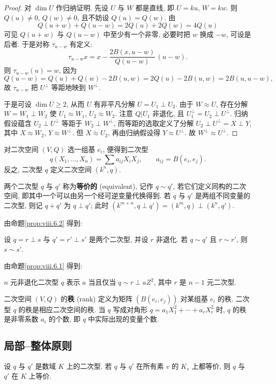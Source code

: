 \begin{proof}
对 $\dim U$ 作归纳证明. 先设 $U$ 与 $W$ 都是直线, 即 $U=ku$, $W=kw$. 则 $Q(u)\ne 0$, $Q(w)\ne 0$, 且不妨设 $Q(u)=Q(w)$. 由
\[
Q(u+w)+Q(u-w)=2Q(u)+2Q(w)=4Q(u)
\]
可见 $Q(u+w)$ 与 $Q(u-w)$ 中至少有一个非零, 必要时把 $w$ 换成 $-w$, 可设是后者. 于是对称 $\tau_{u-w}$ 有定义:
\[
\tau_{u-w}x=x-\frac{2B(x,u-w)}{Q(u-w)}\,(u-w).
\]
则 $\tau_{u-w}(u)=w$, 因为
\[
Q(u-w)=Q(u)+Q(w)-2B(u,w)=2Q(u)-2B(u,w)=2B(u,u-w),
\]
故 $\tau_{u-w}$ 把 $U^{\perp}$ 等距地映到 $W^{\perp}$.

于是可设 $\dim U\ge 2$, 从而 $U$ 有非平凡分解 $U=U_1\perp U_2$. 由于 $W\approx U$, 存在分解 $W=W_1\perp W_2$ 使 $U_1\approx W_1$, $U_2\approx W_2$. 注意 $Q|U_1$ 非退化, 且 $U_1^{\perp}=U_2\perp U^{\perp}$. 归纳假设蕴含 $U_2\perp U^{\perp}$ 等距于 $W_2\perp W^{\perp}$, 而等距的选取定义了分解 $U_2\perp U^{\perp}=X\perp Y$, 其中 $X\approx W_2$, $Y\approx W^{\perp}$. 但 $X\approx U_2$, 再由归纳假设得 $Y\approx U^{\perp}$. 故 $W^{\perp}\approx U^{\perp}$.
\end{proof}

对二次空间 $(V,Q)$ 选一组基 $e_i$, 便得到二次型
\[
q(X_{1},\ldots,X_{n})=\sum a_{ij}X_{i}X_{j},\qquad a_{ij}=B(e_{i},e_{j}).
\]
反之, 二次型 $q$ 定义二次空间 $(k^{n},q)$.

两个二次型 $q$ 与 $q'$ 称为\textbf{等价的} (equivalent), 记作 $q\sim q'$, 若它们定义同构的二次空间, 即其中一个可以由另一个经可逆变量代换得到. 若 $q$ 与 $q'$ 是两组不同变量的二次型, 则记 $q+q'$ 为 $q\perp q'$; 此时 $(k^{m+n},q\perp q')=(k^{m},q)\perp(k^{n},q')$.

由命题\ref{prop:viii.6.2} 得到:

设 $q=r\perp s$ 与 $q'=r'\perp s'$ 是两个二次型, 并设 $r$ 非退化. 若 $q\sim q'$ 且 $r\sim r'$, 则 $s\sim s'$.

由命题\ref{prop:viii.6.1} 得到:

$n$ 元非退化二次型 $q$ 表示 $a$ 当且仅当 $q\sim r\perp aZ^{2}$, 其中 $r$ 是 $n-1$ 元二次型.

二次空间 $(V,Q)$ 的\textbf{秩} (rank) 定义为矩阵 $(B(e_i,e_j))$ 对某组基 $e_i$ 的秩. 二次型 $q$ 的秩是相应二次空间的秩. 当 $q$ 写成对角形 $q=a_1X_1^{2}+\cdots+a_rX_r^{2}$ 时, $q$ 的秩是非零系数 $a_i$ 的个数, 即 $q$ 中实际出现的变量个数.

\subsection*{局部--整体原则}

\begin{theorem}\label{thm:viii.6.3}
设 $q$ 与 $q'$ 是数域 $K$ 上的二次型. 若 $q$ 与 $q'$ 在所有素 $v$ 的 $K_v$ 上都等价, 则 $q$ 与 $q'$ 在 $K$ 上等价.
\end{theorem}

